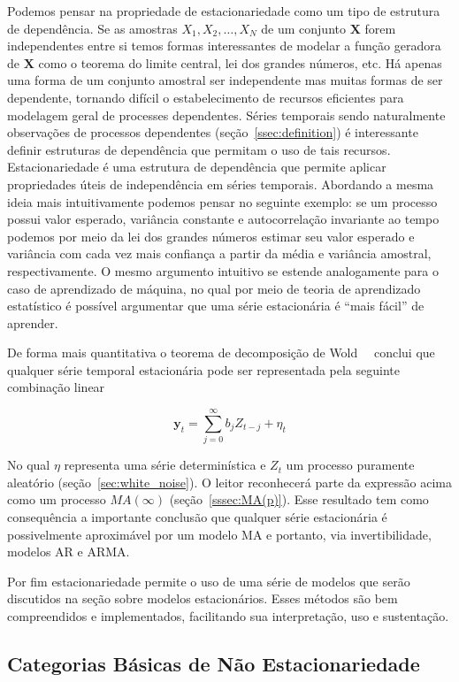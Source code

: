 Podemos pensar na propriedade de estacionariedade como um tipo de estrutura de
dependência. Se as amostras $X_1, X_2, \dots, X_N$ de um conjunto $\mathbf{X}$
forem independentes entre si temos formas interessantes de modelar a função
geradora de $\mathbf{X}$ como o teorema do limite central, lei dos grandes
números, etc. Há apenas uma forma de um conjunto amostral ser independente mas
muitas formas de ser dependente, tornando difícil o estabelecimento de recursos
eficientes para modelagem geral de processes dependentes. Séries temporais
sendo naturalmente observações de processos dependentes
(seção~\ref{ssec:definition}) é interessante definir estruturas de dependência
que permitam o uso de tais recursos. Estacionariedade é uma estrutura de
dependência que permite aplicar propriedades úteis de independência em séries
temporais. Abordando a mesma ideia mais intuitivamente podemos pensar no
seguinte exemplo: se um processo possui valor esperado, variância constante e
autocorrelação invariante ao tempo podemos por meio da lei dos grandes números
estimar seu valor esperado e variância com cada vez mais confiança a partir da
média e variância amostral, respectivamente. O mesmo argumento intuitivo se
estende
analogamente para o caso de aprendizado de máquina, no qual por meio de teoria
de aprendizado estatístico é possível argumentar que uma série estacionária é
``mais fácil'' de aprender.

De forma mais quantitativa o teorema de decomposição de Wold~~\cite{chatfield}
conclui que qualquer série temporal estacionária pode ser representada pela
seguinte combinação linear

$$\mathbf{y}_t = \sum_{j=0}^\infty b_j Z_{t-j} + \eta_t$$

No qual $\eta$ representa uma série determinística e $Z_t$ um processo
puramente aleatório (seção~\ref{sec:white_noise}). O leitor reconhecerá parte
da expressão acima como um processo $MA(\infty)$ (seção~\ref{sssec:MA(p)}).
Esse resultado tem como consequência a importante conclusão que qualquer série
estacionária é possivelmente aproximável por um modelo MA e portanto, via
invertibilidade, modelos AR e ARMA.

Por fim estacionariedade permite o uso de uma série de modelos que serão
discutidos na seção sobre modelos estacionários. Esses métodos são bem
compreendidos e implementados, facilitando sua interpretação, uso e
sustentação.

\subsection{Categorias Básicas de Não Estacionariedade}\label{ssec:taxonomy}

